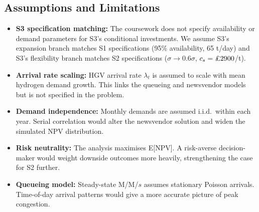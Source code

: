 \documentclass[10pt,a4paper]{article}
\begin{document}
\subsection{Assumptions and Limitations}

\begin{itemize}
    \item \textbf{S3 specification matching:} The coursework does not specify availability or demand parameters for S3's conditional investments. We assume S3's expansion branch matches S1 specifications (95\% availability, 65 t/day) and S3's flexibility branch matches S2 specifications ($\sigma \to 0.6\sigma$, $c_s = \text{\pounds}2900$/t).
    \item \textbf{Arrival rate scaling:} HGV arrival rate $\lambda_t$ is assumed to scale with mean hydrogen demand growth. This links the queueing and newsvendor models but is not specified in the problem.
    \item \textbf{Demand independence:} Monthly demands are assumed i.i.d.\ within each year. Serial correlation would alter the newsvendor solution and widen the simulated NPV distribution.
    \item \textbf{Risk neutrality:} The analysis maximises E[NPV]. A risk-averse decision-maker would weight downside outcomes more heavily, strengthening the case for S2 further.
    \item \textbf{Queueing model:} Steady-state M/M/$s$ assumes stationary Poisson arrivals. Time-of-day arrival patterns would give a more accurate picture of peak congestion.
\end{itemize}
\end{document}
